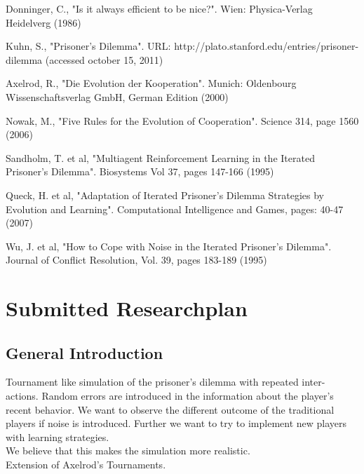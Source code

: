 \documentclass[11pt,twoside]{article}
\begin{document}
\begin{thebibliography}{99}
		Donninger, C., "Is it always efficient to be nice?". Wien: Physica-Verlag Heidelverg (1986)

		Kuhn, S., "Prisoner's Dilemma". URL: http://plato.stanford.edu/entries/prisoner-dilemma (accessed october 15, 2011)

		Axelrod, R., "Die Evolution der Kooperation". Munich: Oldenbourg Wissenschaftsverlag GmbH, German Edition (2000)

		Nowak, M., "Five Rules for the Evolution of Cooperation".  Science 314, page 1560 (2006)

		Sandholm, T. et al, "Multiagent Reinforcement Learning in the Iterated Prisoner's Dilemma". Biosystems Vol 37, pages 147-166 (1995)

		Queck, H. et al, "Adaptation of Iterated Prisoner's Dilemma Strategies by Evolution and Learning". Computational Intelligence and Games, pages: 40-47 (2007)

		Wu, J. et al, "How to Cope with Noise in the Iterated Prisoner's Dilemma". Journal of Conflict Resolution, Vol. 39, pages 183-189 (1995)

\end{thebibliography}

\appendix


%

\section{Submitted Researchplan}
\subsection{General Introduction}
Tournament like simulation of the prisoner's dilemma with repeated inter-
actions. Random errors are introduced in the information about the player's 
recent behavior. We want to observe the different outcome of the traditional
players if noise is introduced. Further we want to try to implement new 
players with learning strategies. \\
We believe that this makes the simulation more realistic.\\
Extension of Axelrod's Tournaments.
\end{document}
